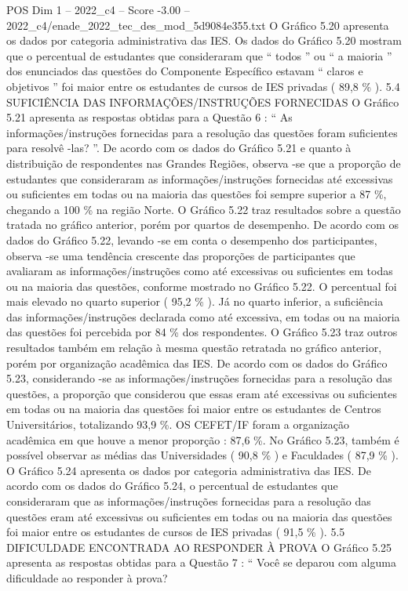 \begin{textsample}{POS Dim 1 – 2022\_c4 – Score -3.00 – 2022\_c4/enade\_2022\_tec\_des\_mod\_5d9084e355.txt}
O Gráfico 5.20 apresenta os dados por categoria administrativa das IES.
Os dados do Gráfico 5.20 mostram que o percentual de estudantes que consideraram que “ todos ” ou “ a maioria ” dos enunciados das questões do Componente Específico estavam “ claros e objetivos ” foi maior entre os estudantes de cursos de IES privadas ( 89,8 \% ). 5.4 SUFICIÊNCIA DAS INFORMAÇÕES/INSTRUÇÕES FORNECIDAS O Gráfico 5.21 apresenta as respostas obtidas para a Questão 6 : “ As informações/instruções fornecidas para a resolução das questões foram suficientes para resolvê -las? ”.
De acordo com os dados do Gráfico 5.21 e quanto à distribuição de respondentes nas Grandes Regiões, observa -se que a proporção de estudantes que consideraram as informações/instruções fornecidas até excessivas ou suficientes em todas ou na maioria das questões foi sempre superior a 87 \%, chegando a 100 \% na região Norte.
O Gráfico 5.22 traz resultados sobre a questão tratada no gráfico anterior, porém por quartos de desempenho.
De acordo com os dados do Gráfico 5.22, levando -se em conta o desempenho dos participantes, observa -se uma tendência crescente das proporções de participantes que avaliaram as informações/instruções como até excessivas ou suficientes em todas ou na maioria das questões, conforme mostrado no Gráfico 5.22.
O percentual foi mais elevado no quarto superior ( 95,2 \% ).
Já no quarto inferior, a suficiência das informações/instruções declarada como até excessiva, em todas ou na maioria das questões foi percebida por 84 \% dos respondentes.
O Gráfico 5.23 traz outros resultados também em relação à mesma questão retratada no gráfico anterior, porém por organização acadêmica das IES.
De acordo com os dados do Gráfico 5.23, considerando -se as informações/instruções fornecidas para a resolução das questões, a proporção que considerou que essas eram até excessivas ou suficientes em todas ou na maioria das questões foi maior entre os estudantes de Centros Universitários, totalizando 93,9 \%.
OS CEFET/IF foram a organização acadêmica em que houve a menor proporção : 87,6 \%.
No Gráfico 5.23, também é possível observar as médias das Universidades ( 90,8 \% ) e Faculdades ( 87,9 \% ).
O Gráfico 5.24 apresenta os dados por categoria administrativa das IES.
De acordo com os dados do Gráfico 5.24, o percentual de estudantes que consideraram que as informações/instruções fornecidas para a resolução das questões eram até excessivas ou suficientes em todas ou na maioria das questões foi maior entre os estudantes de cursos de IES privadas ( 91,5 \% ). 5.5 DIFICULDADE ENCONTRADA AO RESPONDER À PROVA O Gráfico 5.25 apresenta as respostas obtidas para a Questão 7 : “ Você se deparou com alguma dificuldade ao responder à prova?

\end{textsample}
